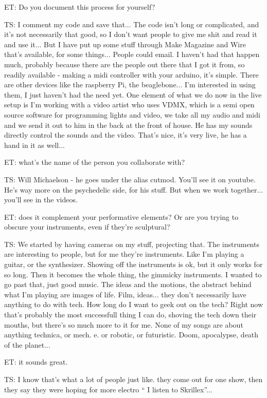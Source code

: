 ET: Do you document this process for yourself? 

TS: I comment my code and save that... The code isn't long or complicated, and it's not necessarily that good, so I don't want people to give me shit and read it and use it... But I have put up some stuff through Make Magazine and Wire that's available, for some things... People could email. I haven't had that happen much, probably because there are the people out there that I got it from, so readily available - making a midi controller with your arduino, it's simple. There are other devices like the raspberry Pi, the beaglebone... I'm interested in using them, I just haven't had the need yet. One element of what we do now in the live setup is I'm working with a video artist who uses VDMX, which is a semi open source software for programming lights and video, we take all my audio and midi and we send it out to him in the back at the front of house. He has my sounds directly control the sounds and the video. That's nice, it's very live, he has a hand in it as well... 

ET: what's the name of the person you collaborate with? 

TS: Will Michaelson - he goes under the alias cutmod. You'll see it on youtube. He's way more on the psychedelic side, for his stuff. But when we work together... you'll see in the videos. 

ET: does it complement your performative elements? Or are you trying to obscure your instruments, even if they're sculptural? 

TS: We started by having cameras on my stuff, projecting that. The instruments are interesting to people, but for me they're instruments. Like I'm playing a guitar, or the synthesizer. Showing off the instruments is ok, but it only works for so long. Then it becomes the whole thing, the gimmicky instruments. I wanted to go past that, just good music. The ideas and the motions, the abstract behind what I'm playing are images of life. Film, ideas... they don't necessarily have anything to do with tech. How long do I want to geek out on the tech? Right now that's probably the most successfull thing I can do, shoving the tech down their mouths, but there's so much more to it for me. None of my songs are about anything technica, or mech. e. or robotic, or futuristic. Doom, apocalypse, death of the planet... 

ET: it sounds great. 

TS: I know that's what a lot of people just like. they come out for one show, then they say they were hoping for more electro `` I listen to Skrillex''... 

